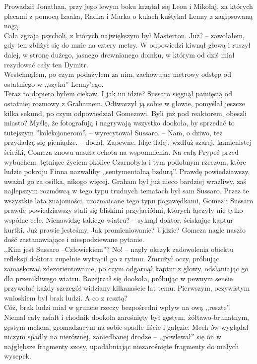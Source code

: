 \documentclass[../MAIN.tex]{subfiles}
\begin{document}
Prowadził Jonathan, przy jego lewym boku krzątał się Leon i Mikołaj, za których plecami z pomocą Izaaka, Radka i Marka o kulach kuśtykał Lenny z zagipsowaną nogą.\\
Cała zgraja psycholi, z których największym był Masterton.
\sx Już? -- zawołałem, gdy ten zbliżył się do mnie na cztery metry.
\qd
W odpowiedzi kiwnął głową i ruszył dalej, w stronę dużego, jasnego drewnianego domku, w którym od dziś miał rezydować cały ten Dymitr.\\
Westchnąłem, po czym podążyłem za nim, zachowując metrowy odstęp od ostatniego w ,,szyku'' Lenny'ego.\\
Teraz to dopiero byłem ciekaw.
\dd\sx I jak im idzie?
\qd
Sussaro sięgnął pamięcią od ostatniej rozmowy z Grahamem. Odtworzył ją sobie w głowie, pomyślał jeszcze kilka sekund, po czym odpowiedział Gomezowi.
\sx Byli już pod reaktorem, obeszli miasto? Myślę, że fotografują i nagrywają wszystko dookoła, by sprzedać to tutejszym ''kolekcjonerom''. -- wyrecytował Sussaro. -- Nam, o dziwo, też przydadzą się pieniądze. -- dodał.
\xx Zapewne.
\qd
Idąc dalej, wzdłuż szarej, kamienistej ścieżki, Gomeza znowu naszła ochota na wspomnienia. Na całą Prypeć przed wybuchem, tętniące życiem okolice Czarnobyla i tym podobnym rzeczom, które ludzie pokroju Finna nazwaliby ,,sentymentalną bzdurą''. Prawdę powiedziawszy, uważał go za osiłka, nikogo więcej. Graham był już nieco bardziej wrażliwy, zaś najlepszym rozmówcą w tego typu trudnych tematach był sam Sussaro. Przez te wszystkie lata znajomości, urozmaicane tego typu pogawędkami, Gomez i Sussaro prawdę powiedziawszy stali się bliskimi przyjaciółmi, których łączyły nie tylko wspólne cele.
\sx Nienawidzę takiego wiatru? -- syknął doktor, ściskając kaptur kurtki.
\xx Już prawie jesteśmy.
\xx Jak promieniowanie?
\xx Ujdzie?
\qd
Gomeza nagle naszło dość zastanawiające i niespodziewane pytanie.\\
,,Kim jest Sussaro --Człowiekiem''?
\sx No! -- nagły okrzyk zadowolenia obiektu refleksji doktora zupełnie wytrącił go z rytmu.
\qd
Zmrużył oczy, próbując zamaskować zdezorientowanie, po czym odgarnął kaptur z głowy, odsłaniając go dla przenikliwego wiatru. Rozejrzał się dookoła, próbując w pewnym sensie przywołać każdy szczegół widziany kilkanaście lat temu. Pierwszym, oczywistym wnioskiem był brak ludzi. A co z resztą?\\
Cóż, brak ludzi miał w gruncie rzeczy bezpośredni wpływ na ową ,,resztę''.\\
Niemal cały asfalt i chodnik dookoła zarośnięty był gęstym, żółtawo-brunatnym, gęstym mchem, gromadzącym na sobie spadłe liście i gałęzie. Mech ów wyglądał niczym spadły na nierównej, zaniedbanej drodze -- ,,powlewał'' się on w najgłębsze fragmenty szosy, upodabniając niezarośnięte fragmenty do małych wysepek.\\
\end{document}
